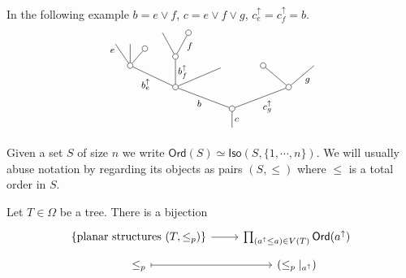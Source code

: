 \documentclass[a4paper,10pt]{article}%
\begin{document}
\begin{example} In the following example $b = e \vee f$, $c = e \vee f \vee g$, $c^{\uparrow}_e= c^{\uparrow}_f =b$.
\[
	\begin{tikzpicture}[grow=up,auto,level distance=1.9em,
	every node/.style = {font=\footnotesize,inner sep=2pt},
	dummy/.style={circle,draw,inner sep=0pt,minimum size=1.75mm}]
		\node at (0,0) {}
			child{node [dummy] {}
				child[sibling distance = 10em]{node [dummy] {}
					child[sibling distance = 4.5em]{
					edge from parent node [swap] {$g$}}
					child[sibling distance = 4.5em]{node [dummy] {}}
				edge from parent node [swap] {$c_g^{\uparrow}$}}
				child[sibling distance = 10em]{node [dummy] {}
					child[sibling distance = 4em,level distance=1.7em]
					child[sibling distance = 1.5em,level distance=2.7em]{node [dummy] {}
						child[level distance=2.1em,sibling distance = 2.3em]{node [dummy] {}
						edge from parent node [near end,swap] {$f$}}		
						child[level distance=2.1em,sibling distance = 2.3em]{
						edge from parent node [near end] {}}
					edge from parent node [swap] {$b^{\uparrow}_{f}$}}
					child[sibling distance = 4em]{node [dummy] {}
						child[sibling distance =1.3em, level distance = 1.5 em]{node [dummy]  {}
						edge from parent node [swap] {}}
						child[sibling distance = 1.3em]{
						edge from parent node [very near end,swap] {}}
						child[sibling distance =1.3em]{
						edge from parent node [very near end] {$e$}}
					edge from parent node {$b^{\uparrow}_e$}}
				edge from parent node {$b$}}
			edge from parent node [swap] {$c$}};
	\end{tikzpicture}
\]
\end{example}

\begin{notation}
	Given a set $S$ of size $n$ we write
	$\textsf{Ord}(S) \simeq \mathsf{Iso}(S,\{1,\cdots,n\})$. We will usually abuse notation by regarding its objects as pairs $(S,\leq)$ where $\leq$ is a total order in $S$.
\end{notation}


\begin{proposition}\label{PLANARIZATIONCHAR PROP}
	Let $T \in \Omega$ be a tree. There is a bijection
	\begin{equation}\label{PLANAR EQ}
	\begin{tikzcd}[row sep = 0.5em]
		\{\text{planar structures }(T,\leq_p)\} \ar[r] &
		\prod_{(a^{\uparrow} \leq a) \in V(T)} \mathsf{Ord}(a^{\uparrow}) \\
		\leq_p \ar[mapsto]{r} & (\leq_p|_{a^{\uparrow}})
	\end{tikzcd}	
	\end{equation}
\end{proposition}
\end{document}
